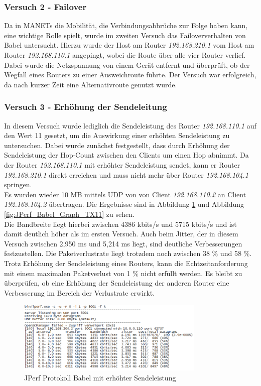 \documentclass[10pt]{scrartcl}
\begin{document}
\subsubsection{Versuch 2 - Failover}
Da in MANETs die Mobilität, die Verbindungsabbrüche zur Folge haben kann, eine wichtige Rolle spielt, wurde im zweiten Versuch das Failoververhalten von Babel untersucht. Hierzu wurde der Host am Router \textit{192.168.210.1} vom Host am Router \textit{192.168.110.1} angepingt, wobei die Route über alle vier Router verlief. Dabei wurde die Netzspannung von einem Gerät entfernt und überprüft, ob der Wegfall eines Routers zu einer Ausweichroute führte. Der Versuch war erfolgreich, da nach kurzer Zeit eine Alternativroute genutzt wurde.

\subsubsection{Versuch 3 - Erhöhung der Sendeleitung}
In diesem Versuch wurde lediglich die Sendeleistung des Router \textit{192.168.110.1} auf den Wert 11 gesetzt, um die Auswirkung einer erhöhten Sendeleistung zu untersuchen. Dabei wurde zunächst festgestellt, dass durch Erhöhung der Sendeleistung der Hop-Count zwischen den Clients um einen Hop abnimmt. Da der Router \textit{192.168.110.1} mit erhöhter Sendeleistung sendet, kann er Router \textit{192.168.210.1} direkt erreichen und muss nicht mehr über Router \textit{192.168.104.1} springen.\\
Es wurden wieder 10 MB mittels UDP von von Client \textit{192.168.110.2} an Client \textit{192.168.104.2} übertragen. Die Ergebnisse sind in Abbildung \ref{fig:JPerf_Babel_Protokoll_TX11} und Abbildung \ref{fig:JPerf_Babel_Graph_TX11} zu sehen.\\
Die Bandbreite liegt hierbei zwischen 4386 kbits/s und 5715 kbits/s und ist damit deutlich höher als im ersten Versuch. Auch beim Jitter, der in diesem Versuch zwischen 2,950 ms und 5,214 ms liegt, sind deutliche Verbesserungen festzustellen. Die Paketverlustrate liegt trotzdem noch zwischen 38 \% und 58 \%.\\
Trotz Erhöhung der Sendeleistung eines Routers, kann die Echtzeitanforderung mit einem maximalen Paketverlust von 1 \% nicht erfüllt werden. Es bleibt zu überprüfen, ob eine Erhöhung der Sendeleistung der anderen Router eine Verbesserung im Bereich der Verlustrate erwirkt.

\begin{figure}[htbp]
	\centering	\includegraphics[width=0.8\textwidth]{Grafiken/Babel_TX11_Protokoll.png}
	\caption{JPerf Protokoll Babel mit erhöhter Sendeleistung}
	\label{fig:JPerf_Babel_Protokoll_TX11}
\end{figure}
\end{document}
